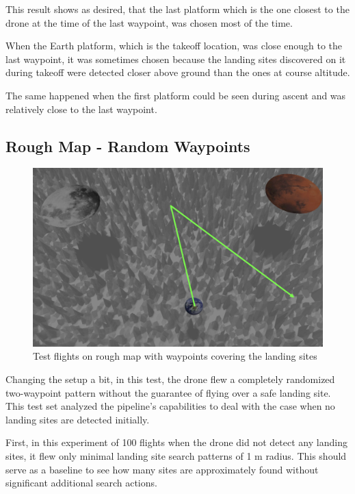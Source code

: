         This result shows as desired, that the last platform which is the one closest to the drone at the time of the last waypoint, was chosen most of the time. 
        
        When the Earth platform, which is the takeoff location, was close enough to the last waypoint, it was sometimes chosen because the landing sites discovered on it during takeoff were detected closer above ground than the ones at course altitude.

        The same happened when the first platform could be seen during ascent and was relatively close to the last waypoint.


\subsection{Rough Map - Random Waypoints}\label{subsec:rough_map_rw}

    \begin{figure}[h]
        \centering
        \includegraphics[scale=0.24]{images/evaluation/rough_complete_rand.png}
        \caption{Test flights on rough map with waypoints covering the landing sites}
        \label{fig:rough_compl_rand}
    \end{figure}

    Changing the setup a bit, in this test, the drone flew a completely randomized two-waypoint pattern without the guarantee of flying over a safe landing site. This test set analyzed the pipeline's capabilities to deal with the case when no landing sites are detected initially.

    First, in this experiment of 100 flights when the drone did not detect any landing sites, it flew only minimal landing site search patterns of 1 m radius. This should serve as a baseline to see how many sites are approximately found without significant additional search actions.

